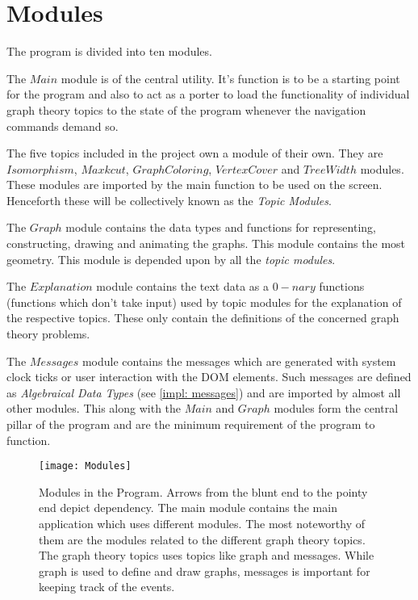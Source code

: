 \section{Modules}

The program is divided into ten modules.

The $Main$ module is of the central utility. It's function is to be a
starting point for the program and also to act as a porter to load the
functionality of individual graph theory topics to the state of the program
whenever the navigation commands demand so. 

The five topics included in the project own a module of their own. They are
$Isomorphism$, $Maxkcut$, $GraphColoring$, $VertexCover$ and $TreeWidth$ modules.
These modules are imported by the main function to be used on the screen.
Henceforth these will be collectively known as the \emph{Topic Modules}.

The $Graph$ module contains the data types and functions for representing,
constructing, drawing and animating the graphs. This module contains the most
geometry. This module is depended upon by all the \emph{topic modules}.

The $Explanation$ module contains the text data as a $0-nary$ functions
(functions which don't take input) used by topic modules for the explanation of
the respective topics. These only contain the definitions of the concerned
graph theory problems.

The $Messages$ module contains the messages which are generated with system
clock ticks or user interaction with the DOM elements.  Such messages are
defined as \emph{Algebraical Data Types} (see \autoref{impl: messages}) and are
imported by almost all other modules. This along with the $Main$ and $Graph$
modules form the central pillar of the program and are the minimum requirement
of the program to function.

\begin{figure}[h]
\centering
\texttt{[image: Modules]}
\caption{
        Modules in the Program. Arrows from the blunt end to the pointy end
        depict dependency. The main module contains the main application which
        uses different modules.  The most noteworthy of them are the modules
        related to the different graph theory topics.  The graph theory topics
        uses topics like graph and messages.  While graph is used to define and
        draw graphs, messages is important for keeping track of the events.
        }
\end{figure}

